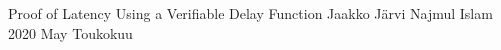\documentclass[a4paper,12pt]{report}
\begin{document}

\renewcommand{\appname}{Appendices}

{Proof of Latency Using a Verifiable Delay Function}
{Jaakko Järvi}
{Najmul Islam}
{2020}
{May}
{Toukokuu}


\gentitle



%
%
\pagestyle{empty}


%
%
\tableofcontents
\clearpage
\setcounter{page}{0}
\listoffigures 
\clearpage
\setcounter{page}{0}
\listoftables

%
%
%
\end{document}
